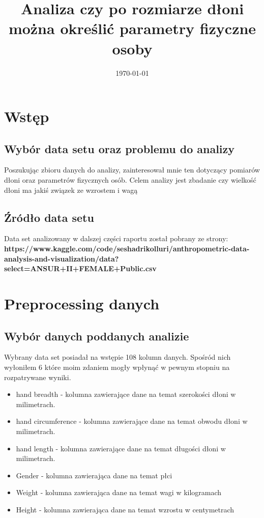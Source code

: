 \documentclass{article}
\title{Analiza czy po rozmiarze dłoni można określić parametry fizyczne osoby}
\date{\today}
\begin{document}
\maketitle

\tableofcontents
\newpage

\section{Wstęp}
\subsection{Wybór data setu oraz problemu do analizy}

Poszukując zbioru danych do analizy, zainteresował mnie ten dotyczący pomiarów dłoni oraz parametrów fizycznych osób. Celem analizy jest zbadanie czy
wielkość dłoni ma jakiś związek ze wzrostem i wagą

\subsection{Źródło data setu}

Data set analizowany w dalszej części raportu został pobrany ze strony:\\
\textbf{https://www.kaggle.com/code/seshadrikolluri/anthropometric-data-analysis-and-visualization/data?select=ANSUR+II+FEMALE+Public.csv}
\newpage


\section{Preprocessing danych}
\subsection{Wybór danych poddanych analizie}
Wybrany data set posiadał na wstępie 108 kolumn danych. Spośród nich wyłoniłem 6 które moim zdaniem mogły wpłynąć w pewnym stopniu na rozpatrywane wyniki. 
\begin{itemize}
    \item hand breadth - kolumna zawierające dane na temat szerokości dłoni w milimetrach.
    \item hand circumference - kolumna zawierające dane na temat obwodu dłoni w milimetrach.
    \item hand length - kolumna zawierające dane na temat długości dłoni w milimetrach.
    \item Gender - kolumna zawierająca dane na temat płci
    \item Weight - kolumna zawierająca dane na temat wagi w kilogramach
    \item Height - kolumna zawierająca dane na temat wzrostu w centymetrach
\end{itemize}
\end{document}
